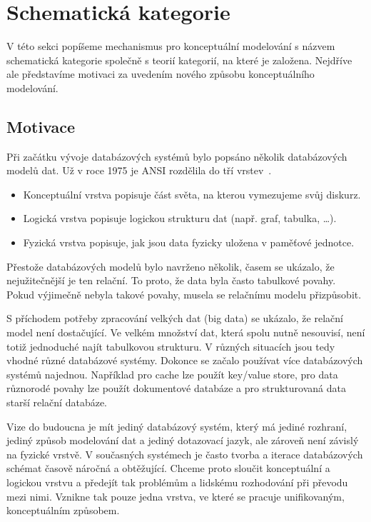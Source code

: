 \section{Schematická kategorie}\label{section:schemcat}

V této sekci popíšeme mechanismus pro konceptuální modelování s názvem schematická kategorie společně s teorií kategorií, na které je založena.
Nejdříve ale představíme motivaci za uvedením nového způsobu konceptuálního modelování.

\subsection{Motivace}

Při začátku vývoje databázových systémů bylo popsáno několik databázových modelů dat.
Už v roce 1975 je ANSI rozdělila do tří vrstev~\cite{steeljr._interimreport_1975}.
\begin{itemize}
  \item Konceptuální vrstva popisuje část světa, na kterou vymezujeme svůj diskurz.
  \item Logická vrstva popisuje logickou strukturu dat (např. graf, tabulka, \dots).
  \item Fyzická vrstva popisuje, jak jsou data fyzicky uložena v paměťové jednotce.
\end{itemize}

Přestože databázových modelů bylo navrženo několik, časem se ukázalo, že nejužitečnější je ten relační.
To proto, že data byla často tabulkové povahy.
Pokud výjimečně nebyla takové povahy, musela se relačnímu modelu přizpůsobit.

S příchodem potřeby zpracování velkých dat (big data) se ukázalo, že relační model není dostačující.
Ve velkém množství dat, která spolu nutně nesouvisí, není totiž jednoduché najít tabulkovou strukturu.
V různých situacích jsou tedy vhodné různé databázové systémy.
Dokonce se začalo používat více databázových systémů najednou.
Například pro cache lze použít key/value store, pro data různorodé povahy lze použít dokumentové databáze a pro strukturovaná data starší relační databáze.

Vize do budoucna je mít jediný databázový systém, který má jediné rozhraní, jediný způsob modelování dat a jediný dotazovací jazyk, ale zároveň není závislý na fyzické vrstvě.
V současných systémech je často tvorba a iterace databázových schémat časově náročná a obtěžující.
Chceme proto sloučit konceptuální a logickou vrstvu a předejít tak problémům a lidskému rozhodování při převodu mezi nimi.
Vznikne tak pouze jedna vrstva, ve které se pracuje unifikovaným, konceptuálním způsobem.

